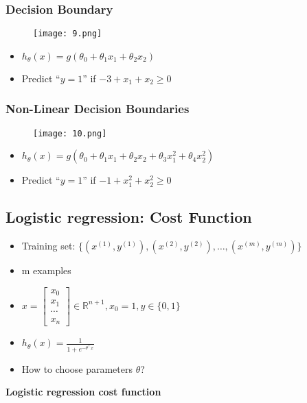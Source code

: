 \documentclass[12pt,a4paper,fleqn]{article}
\begin{document}
 \subsubsection{Decision Boundary} 
 \begin{figure}[H]
     \centering
     \texttt{[image: 9.png]}
 \end{figure}
 \begin{itemize}
    \item \(h_\theta(x)=g\left(\theta_0+\theta_1 x_1+\theta_2 x_2\right)\)
    \item Predict ``\(y=1\)'' if \(-3+x_1+x_2 \geq 0\)
 \end{itemize}
  \subsubsection{Non-Linear Decision Boundaries} 
 \begin{figure}[H]
     \centering
     \texttt{[image: 10.png]}
 \end{figure}
 \begin{itemize}
    \item \(h_\theta(x)=g\left(\theta_0+\theta_1 x_1+\theta_2 x_2+\theta_3 x_1^2+\theta_4 x_2^2\right)\)
    \item Predict  ``\(y=1\)'' if \(-1+x_1^2+x_2^2 \geq 0\)
 \end{itemize}
  \subsection{Logistic regression: Cost Function} 
  \begin{itemize}
    \item Training set: \( \{ \left(x^{(1)}, y^{(1)}\right),\left(x^{(2)}, y^{(2)}\right), \ldots,\left(x^{(m)}, y^{(m)}\right)\} \)
    \item m examples
    \item \(x=\left[\begin{array}{c}x_0 \\ x_1 \\ \cdots \\ x_n\end{array}\right] \in \mathbb{R}^{n+1}, x_0=1, y \in \{0,1\} \)
    \item \(h_\theta(x)=\frac{1}{1+e^{-\theta^{\top} x}}\)
    \item How to choose parameters \(\theta \)?
  \end{itemize}

  \textbf{Logistic regression cost function}
\end{document}

